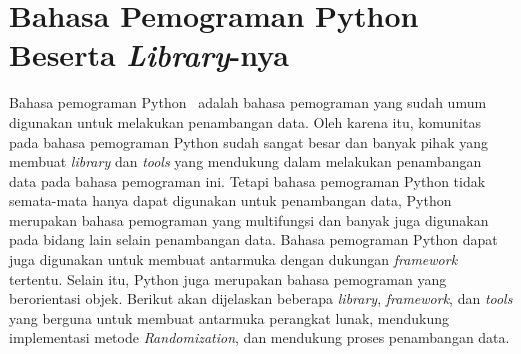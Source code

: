 \section{Bahasa Pemograman Python Beserta \textit{Library}-nya}
\label{sec:metoderandomization}

Bahasa pemograman Python~\cite{python:95:guido} adalah bahasa pemograman yang sudah umum digunakan untuk melakukan penambangan data. Oleh karena itu, komunitas pada bahasa pemograman Python sudah sangat besar dan banyak pihak yang membuat \textit{library} dan \textit{tools} yang mendukung dalam melakukan penambangan data pada bahasa pemograman ini. Tetapi bahasa pemograman Python tidak semata-mata hanya dapat digunakan untuk penambangan data, Python merupakan bahasa pemograman yang multifungsi dan banyak juga digunakan pada bidang lain selain penambangan data. Bahasa pemograman Python dapat juga digunakan untuk membuat antarmuka dengan dukungan \textit{framework} tertentu. Selain itu, Python juga merupakan bahasa pemograman yang berorientasi objek. Berikut akan dijelaskan beberapa \textit{library}, \textit{framework}, dan \textit{tools} yang berguna untuk membuat antarmuka perangkat lunak, mendukung implementasi metode \textit{Randomization}, dan mendukung proses penambangan data.

